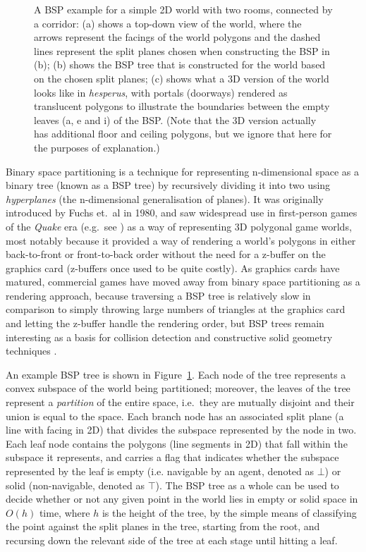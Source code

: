 \documentclass[10pt,twocolumn]{article}
\newenvironment{stusubfig}[1]
{
	\begin{figure}[#1]
	\begin{center}
}
{
	\end{center}
	\end{figure}
}
\begin{document}
\begin{stusubfig}{!t}
\caption{A BSP example for a simple 2D world with two rooms, connected by a corridor: (a) shows a top-down view of the world, where the arrows represent the facings of the world polygons and the dashed lines represent the split planes chosen when constructing the BSP in (b); (b) shows the BSP tree that is constructed for the world based on the chosen split planes; (c) shows what a 3D version of the world looks like in \emph{hesperus}, with portals (doorways) rendered as translucent polygons to illustrate the boundaries between the empty leaves (a, e and i) of the BSP. (Note that the 3D version actually has additional floor and ceiling polygons, but we ignore that here for the purposes of explanation.)}
\label{fig:bsp-example}
\end{stusubfig}

Binary space partitioning is a technique for representing n-dimensional space as a binary tree (known as a BSP tree) by recursively dividing it into two using \emph{hyperplanes} (the n-dimensional generalisation of planes). It was originally introduced by Fuchs et.\ al \cite{fuchs80} in 1980, and saw widespread use in first-person games of the \emph{Quake} era (e.g.~see \cite{abrash97}) as a way of representing 3D polygonal game worlds, most notably because it provided a way of rendering a world's polygons in either back-to-front or front-to-back order \cite{fuchs80,gordon91} without the need for a z-buffer on the graphics card (z-buffers once used to be quite costly). As graphics cards have matured, commercial games have moved away from binary space partitioning as a rendering approach, because traversing a BSP tree is relatively slow in comparison to simply throwing large numbers of triangles at the graphics card and letting the z-buffer handle the rendering order, but BSP trees remain interesting as a basis for collision detection and constructive solid geometry techniques \cite{ericson05,lysenko08}.

An example BSP tree is shown in Figure~\ref{fig:bsp-example}. Each node of the tree represents a convex subspace of the world being partitioned; moreover, the leaves of the tree represent a \emph{partition} of the entire space, i.e.~they are mutually disjoint and their union is equal to the space. Each branch node has an associated split plane (a line with facing in 2D) that divides the subspace represented by the node in two. Each leaf node contains the polygons (line segments in 2D) that fall within the subspace it represents, and carries a flag that indicates whether the subspace represented by the leaf is empty (i.e. navigable by an agent, denoted as $\bot$) or solid (non-navigable, denoted as $\top$). The BSP tree as a whole can be used to decide whether or not any given point in the world lies in empty or solid space in $O(h)$ time, where $h$ is the height of the tree, by the simple means of classifying the point against the split planes in the tree, starting from the root, and recursing down the relevant side of the tree at each stage until hitting a leaf.
\end{document}

